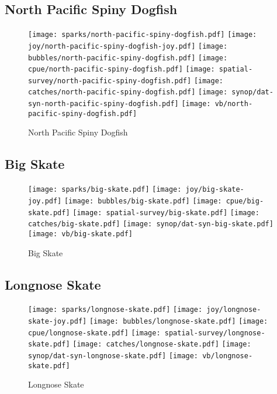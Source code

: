 \subsection*{North Pacific Spiny Dogfish}

\begin{figure}[htbp]
\centering
\texttt{[image: sparks/north-pacific-spiny-dogfish.pdf]}
\texttt{[image: joy/north-pacific-spiny-dogfish-joy.pdf]}
\texttt{[image: bubbles/north-pacific-spiny-dogfish.pdf]}
\texttt{[image: cpue/north-pacific-spiny-dogfish.pdf]}
\texttt{[image: spatial-survey/north-pacific-spiny-dogfish.pdf]}
\texttt{[image: catches/north-pacific-spiny-dogfish.pdf]}
\texttt{[image: synop/dat-syn-north-pacific-spiny-dogfish.pdf]}
\texttt{[image: vb/north-pacific-spiny-dogfish.pdf]}
\caption{North Pacific Spiny Dogfish}
\end{figure}
\clearpage
\subsection*{Big Skate}

\begin{figure}[htbp]
\centering
\texttt{[image: sparks/big-skate.pdf]}
\texttt{[image: joy/big-skate-joy.pdf]}
\texttt{[image: bubbles/big-skate.pdf]}
\texttt{[image: cpue/big-skate.pdf]}
\texttt{[image: spatial-survey/big-skate.pdf]}
\texttt{[image: catches/big-skate.pdf]}
\texttt{[image: synop/dat-syn-big-skate.pdf]}
\texttt{[image: vb/big-skate.pdf]}
\caption{Big Skate}
\end{figure}
\clearpage
\subsection*{Longnose Skate}

\begin{figure}[htbp]
\centering
\texttt{[image: sparks/longnose-skate.pdf]}
\texttt{[image: joy/longnose-skate-joy.pdf]}
\texttt{[image: bubbles/longnose-skate.pdf]}
\texttt{[image: cpue/longnose-skate.pdf]}
\texttt{[image: spatial-survey/longnose-skate.pdf]}
\texttt{[image: catches/longnose-skate.pdf]}
\texttt{[image: synop/dat-syn-longnose-skate.pdf]}
\texttt{[image: vb/longnose-skate.pdf]}
\caption{Longnose Skate}
\end{figure}
\clearpage
